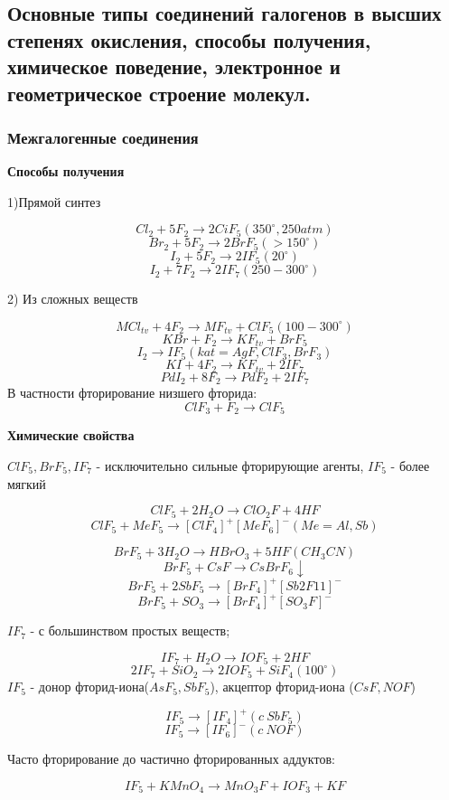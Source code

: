 

\subsection{Основные типы соединений галогенов в высших степенях окисления, способы получения, химическое поведение, электронное и геометрическое строение молекул.}

\subsubsection*{Межгалогенные соединения}

\textbf{Способы получения}

1)Прямой синтез

$$Cl_2 + 5F_2 \rightarrow 2CiF_5 (350^{\circ}, 250 atm)$$
$$Br_2 + 5F_2 \rightarrow 2BrF_5 (>150^{\circ})$$
$$I_2 + 5F_2 \rightarrow 2IF_5 (20^{\circ})$$
$$I_2 + 7F_2 \rightarrow 2IF_7 (250-300^{\circ})$$

2) Из сложных веществ

$$MCl_{tv} + 4F_2 \rightarrow MF_{tv} + ClF_5(100-300^{\circ})$$
$$KBr + F_2 \rightarrow KF_{tv} + BrF_5$$
$$I_2 \rightarrow IF_5 (kat=AgF,ClF_3, BrF_3)$$
$$KI + 4F_2 \rightarrow KF_{tv} + 2IF_7$$
$$PdI_2 + 8F_2 \rightarrow PdF_2 + 2IF_7$$
В частности фторирование низшего фторида:
$$ClF_3 + F_2 \rightarrow ClF_5$$

\textbf{Химические свойства}

$ClF_5, BrF_5, IF_7$ - исключительно сильные фторирующие агенты, $IF_5$ - более мягкий

$$ClF_5 + 2H_2O \rightarrow ClO_2F + 4HF$$
$$ClF_5 + MeF_5 \rightarrow [ClF_4]^+[MeF_6]^-(Me= Al,Sb)$$

$$BrF_5 + 3H_2O \rightarrow HBrO_3 + 5HF (CH_3CN)$$
$$BrF_5 + CsF \rightarrow CsBrF_6\downarrow$$
$$BrF_5 + 2SbF_5 \rightarrow[BrF_4]^+[Sb2F11]^-$$
$$BrF_5 + SO_3 \rightarrow [BrF_4]^+[SO_3F]^-$$

$IF_7$ - с большинством простых веществ;

$$IF_7 + H_2O \rightarrow IOF_5 + 2HF$$
$$2IF_7 + SiO_2 \rightarrow 2IOF_5 + SiF_4 (100^{\circ})$$
$IF_5$ - донор фторид-иона($AsF_5,SbF_5$), акцептор фторид-иона ($CsF, NOF$)

$$IF_5 \rightarrow [IF_4]^+(c\ SbF_5)$$
$$IF_5 \rightarrow [IF_6]^-(c\ NOF)$$

Часто фторирование до частично фторированных аддуктов:

$$IF_5 + KMnO_4 \rightarrow MnO_3F + IOF_3 + KF$$

